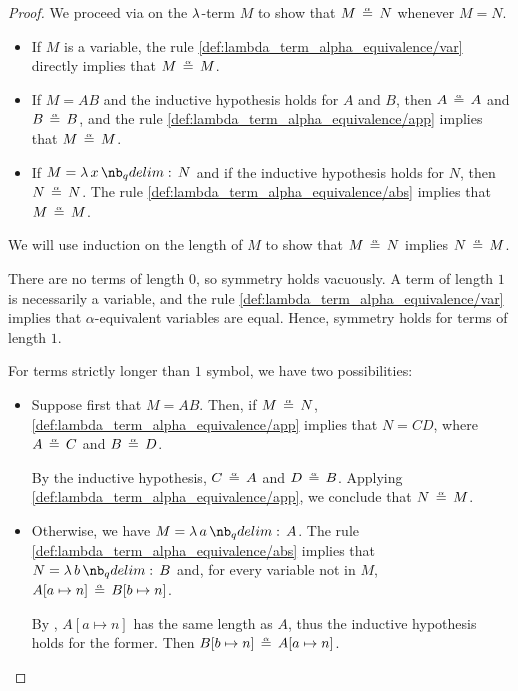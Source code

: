 \begin{proof}

   We proceed via  on the \( \mathrm{\lambda} \)-term \( M \) to show that \( M \aequiv N \) whenever \( M = N \).
  \begin{itemize}
    \item If \( M \) is a variable, the rule \ref{def:lambda_term_alpha_equivalence/var} directly implies that \( M \aequiv M \).
    \item If \( M = AB \) and the inductive hypothesis holds for \( A \) and \( B \), then \( A \aequiv A \) and \( B \aequiv B \), and the rule \ref{def:lambda_term_alpha_equivalence/app} implies that \( M \aequiv M \).
    \item If \( M = \qabs x N \) and if the inductive hypothesis holds for \( N \), then \( N \aequiv N \). The rule \ref{def:lambda_term_alpha_equivalence/abs} implies that \( M \aequiv M \).
  \end{itemize}

   We will use induction on the length of \( M \) to show that \( M \aequiv N \) implies \( N \aequiv M \).

  There are no terms of length \( 0 \), so symmetry holds vacuously. A term of length \( 1 \) is necessarily a variable, and the rule \ref{def:lambda_term_alpha_equivalence/var} implies that \( \alpha \)-equivalent variables are equal. Hence, symmetry holds for terms of length \( 1 \).

  For terms strictly longer than \( 1 \) symbol, we have two possibilities:
  \begin{itemize}
    \item Suppose first that \( M = AB \). Then, if \( M \aequiv N \), \ref{def:lambda_term_alpha_equivalence/app} implies that \( N = CD \), where \( A \aequiv C \) and \( B \aequiv D \).

    By the inductive hypothesis, \( C \aequiv A \) and \( D \aequiv B \). Applying \ref{def:lambda_term_alpha_equivalence/app}, we conclude that \( N \aequiv M \).

    \item Otherwise, we have \( M = \qabs a A \). The rule \ref{def:lambda_term_alpha_equivalence/abs} implies that \( N = \qabs b B \) and, for every variable not in \( M \), \( A[a \mapsto n] \aequiv B[b \mapsto n] \).

    By , \( A[a \mapsto n] \) has the same length as \( A \), thus the inductive hypothesis holds for the former. Then \( B[b \mapsto n] \aequiv A[a \mapsto n] \).


\end{itemize}
\end{proof}
